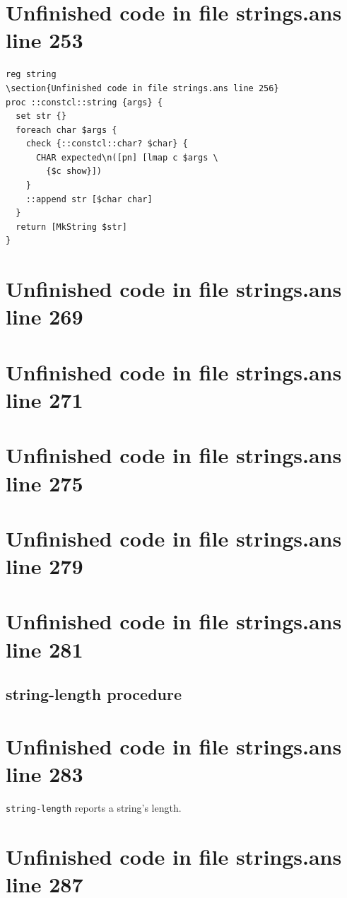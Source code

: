 \documentclass[twoside,9pt]{report}
\begin{document}
\section{Unfinished code in file strings.ans line 253}
\begin{lstlisting}
reg string
\section{Unfinished code in file strings.ans line 256}
proc ::constcl::string {args} {
  set str {}
  foreach char $args {
    check {::constcl::char? $char} {
      CHAR expected\n([pn] [lmap c $args \
        {$c show}])
    }
    ::append str [$char char]
  }
  return [MkString $str]
}
\end{lstlisting}
\section{Unfinished code in file strings.ans line 269}
\section{Unfinished code in file strings.ans line 271}
\section{Unfinished code in file strings.ans line 275}
\section{Unfinished code in file strings.ans line 279}
\section{Unfinished code in file strings.ans line 281}
\subsection{string-length procedure}
\label{string-length-procedure}
\section{Unfinished code in file strings.ans line 283}


\texttt{string-length} reports a string's length.

\section{Unfinished code in file strings.ans line 287}
\end{document}
